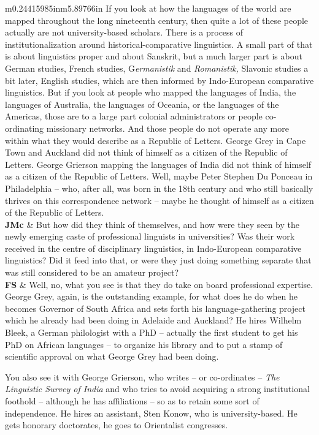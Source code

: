 \documentclass[12pt]{article}
\begin{document}
\begin{flushleft}
\begin{supertabular}{m{0.24415985in}m{5.89766in}}
If you look at how the languages of the world are mapped throughout the long nineteenth century, then quite a lot of these people actually are not university-based scholars. There is a process of institutionalization around historical-comparative linguistics. A small part of that is about linguistics proper and about Sanskrit, but a much larger part is about German studies, French studies, G\textit{ermanistik }and\textit{ Romanistik, }Slavonic studies a bit later, English studies, which are then informed by Indo-European comparative linguistics. But if you look at people who mapped the languages of India, the languages of Australia, the languages of Oceania, or the languages of the Americas, those are to a large part colonial administrators or people co-ordinating missionary networks. And those people do not operate any more within what they would describe as a Republic of Letters. George Grey in Cape Town and Auckland did not think of himself as a citizen of the Republic of Letters. George Grierson mapping the languages of India did not think of himself as a citizen of the Republic of Letters. Well, maybe Peter Stephen Du Ponceau in Philadelphia – who, after all, was born in the 18th century and who still basically thrives on this correspondence network – maybe he thought of himself as a citizen of the Republic of Letters.\\
\textbf{JMc}\newline
 &
But how did they think of themselves, and how were they seen by the newly emerging caste of professional linguists in universities? Was their work received in the centre of disciplinary linguistics, in Indo-European comparative linguistics? Did it feed into that, or were they just doing something separate that was still considered to be an amateur project?\\
\textbf{FS}\newline
 &
Well, no, what you see is that they do take on board professional expertise. George Grey, again, is the outstanding example, for what does he do when he becomes Governor of South Africa and sets forth his language-gathering project which he already had been doing in Adelaide and Auckland? He hires Wilhelm Bleek, a German philologist with a PhD – actually the first student to get his PhD on African languages – to organize his library and to put a stamp of scientific approval on what George Grey had been doing. 

You also see it with George Grierson, who writes – or co-ordinates – \textit{The Linguistic Survey of India} and who tries to avoid acquiring a strong institutional foothold – although he has affiliations – so as to retain some sort of independence. He hires an assistant, Sten Konow, who is university-based. He gets honorary doctorates, he goes to Orientalist congresses. 


\end{supertabular}
\end{flushleft}
\end{document}
